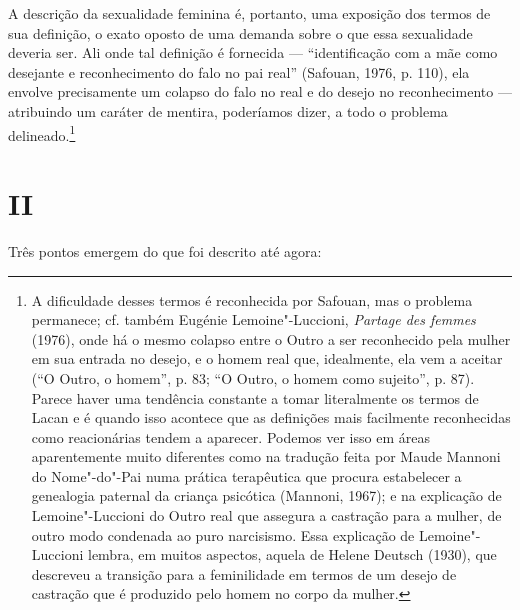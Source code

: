A descrição da sexualidade feminina é, portanto, uma exposição dos
termos de sua definição, o exato oposto de uma demanda sobre o que essa
sexualidade deveria ser. Ali onde tal definição é fornecida ---
``identificação com a mãe como desejante e reconhecimento do falo no pai
real'' (Safouan, 1976, p. 110), ela envolve precisamente um colapso do
falo no real e do desejo no reconhecimento ­--- atribuindo um caráter de
mentira, poderíamos dizer, a todo o problema delineado.\footnote{A
  dificuldade desses termos é reconhecida por Safouan, mas o problema
  permanece; cf. também Eugénie Lemoine"-Luccioni, \emph{Partage des
  femmes} (1976), onde há o mesmo colapso entre o Outro a ser
  reconhecido pela mulher em sua entrada no desejo, e o homem real que,
  idealmente, ela vem a aceitar (``O Outro, o homem'', p. 83; ``O Outro,
  o homem como sujeito'', p. 87). Parece haver uma tendência constante a
  tomar literalmente os termos de Lacan e é quando isso acontece que as
  definições mais facilmente reconhecidas como reacionárias tendem a
  aparecer. Podemos ver isso em áreas aparentemente muito diferentes
  como na tradução feita por Maude Mannoni do Nome"-do"-Pai numa prática
  terapêutica que procura estabelecer a genealogia paternal da criança
  psicótica (Mannoni, 1967); e na explicação de Lemoine"-Luccioni do
  Outro real que assegura a castração para a mulher, de outro modo
  condenada ao puro narcisismo. Essa explicação de Lemoine"-Luccioni
  lembra, em muitos aspectos, aquela de Helene Deutsch (1930), que
  descreveu a transição para a feminilidade em termos de um desejo de
  castração que é produzido pelo homem no corpo da mulher.}

\section{II}

Três pontos emergem do que foi descrito até agora:

